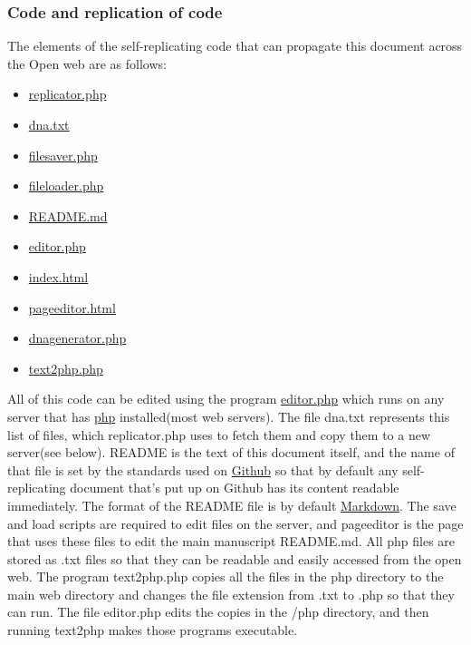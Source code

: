 \subsubsection{Code and replication of
code}\label{code-and-replication-of-code}

The elements of the self-replicating code that can propagate this
document across the Open web are as follows:

\begin{itemize}
\tightlist
\item
  \href{php/replicator.txt}{replicator.php}
\item
  \href{data/dna.txt}{dna.txt}
\item
  \href{php/filesaver.txt}{filesaver.php}
\item
  \href{php/fileloader.txt}{fileloader.php}
\item
  \url{README.md}
\item
  \href{php/editor.txt}{editor.php}
\item
  \url{index.html}
\item
  \url{pageeditor.html}
\item
  \href{php/dnagenerator.txt}{dnagenerator.php}
\item
  \href{php/text2php.txt}{text2php.php}
\end{itemize}

All of this code can be edited using the program \url{editor.php} which
runs on any server that has \href{https://www.php.net/}{php}
installed(most web servers). The file dna.txt represents this list of
files, which replicator.php uses to fetch them and copy them to a new
server(see below). README is the text of this document itself, and the
name of that file is set by the standards used on
\href{https://github.com/}{Github} so that by default any
self-replicating document that's put up on Github has its content
readable immediately. The format of the README file is by default
\href{https://daringfireball.net/projects/markdown/syntax}{Markdown}.
The save and load scripts are required to edit files on the server, and
pageeditor is the page that uses these files to edit the main manuscript
README.md. All php files are stored as .txt files so that they can be
readable and easily accessed from the open web. The program text2php.php
copies all the files in the php directory to the main web directory and
changes the file extension from .txt to .php so that they can run. The
file editor.php edits the copies in the /php directory, and then running
text2php makes those programs executable.

